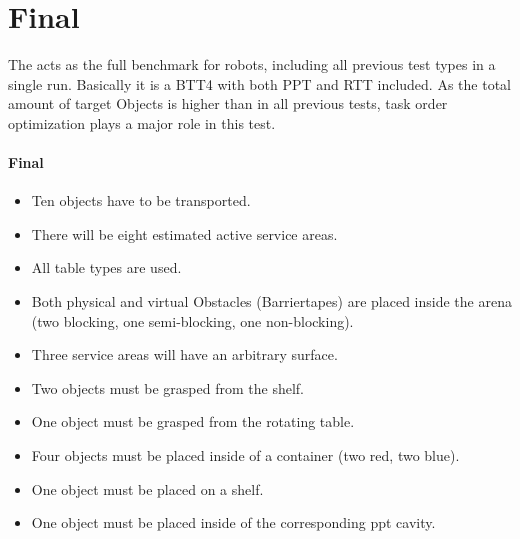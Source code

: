 \section{Final}
\label{sec:Final}

The  acts as the full benchmark for robots, including all previous test types in a single run.
Basically it is a BTT4 with both PPT and RTT included.
As the total amount of target Objects is higher than in all previous tests, task order optimization plays a major role in this test.

\paragraph{Final}
\begin{itemize}
\item Ten objects have to be transported.
\item There will be eight estimated active service areas.
\item All table types are used.
\item Both physical and virtual Obstacles (Barriertapes) are placed inside the arena (two blocking, one semi-blocking, one non-blocking).
\item Three service areas will have an arbitrary surface.
\item Two objects must be grasped from the shelf.
\item One object must be grasped from the rotating table.
\item Four objects must be placed inside of a container (two red, two blue). 
\item One object must be placed on a shelf.
\item One object must be placed inside of the corresponding ppt cavity.
\end{itemize}


